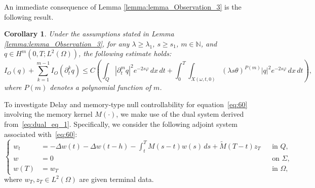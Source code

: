 \documentclass[12pt]{article}
\theoremstyle{plain}
\newtheorem{corollary}[theorem]{Corollary}
\theoremstyle{definition}
\begin{document}
An immediate consequence of Lemma \ref{lemma:lemma_Observation_3} is the following result.

\begin{corollary}\cite{chaves2017controllability}
\label{cor:cor_1}
Under the assumptions stated in Lemma \ref{lemma:lemma_Observation_3}, for any $\lambda \geq \lambda_1$, $s \geq s_1$, $m \in \mathbb{N}$, and $q \in H^m(0,T;L^2(\Omega))$, the following estimate holds:
\begin{equation}
I_O(q) + \sum_{k=1}^{m-1} I_O(\partial_t^k q)
\leq C \left( \int_Q |\partial_t^m q|^2 e^{-2s\varphi} \, dx \, dt + \int_0^T \int_{X(\omega,t,0)} (\lambda s \theta)^{P(m)} |q|^2 e^{-2s\varphi} \, dx \, dt \right),
\end{equation}
where $P(m)$ denotes a polynomial function of $m$.
\end{corollary}




















































To investigate Delay and memory-type null controllability for equation~\eqref{eq:60} involving the memory kernel $M(\cdot)$, we make use of the dual system derived from~\eqref{eq:dual_eq_1}. Specifically, we consider the following adjoint system associated with~\eqref{eq:60}:
\begin{equation}
\label{eq:74}
\left\{
\begin{aligned}
w_t &= -\Delta w(t) - \Delta w(t-h) - \int_t^T M(s - t)w(s)\,ds + \widetilde{M}(T - t)z_T && \text{in } Q, \\
w &= 0 && \text{on } \Sigma, \\
w(T) &= w_T && \text{in } \Omega,
\end{aligned}
\right.
\end{equation}
where $w_T, z_T \in L^2(\Omega)$ are given terminal data.
\end{document}
